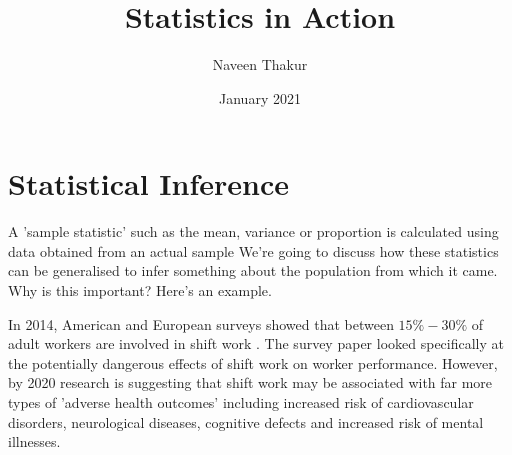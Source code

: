 \documentclass[a4paper,twosided,notoc]{tufte-book}
\author{Naveen Thakur}
\title{Statistics in Action}
\date{January 2021}
\begin{document}
\maketitle
\begin{fullwidth}
	\tableofcontents
\end{fullwidth}


\chapter{Statistical Inference}
A 'sample statistic' such as the mean, variance or proportion is calculated using data obtained from an actual sample 
We're going to discuss how these statistics can be generalised to infer something about the population from which it came. Why is this important? Here's an example.

In 2014, American and European surveys showed that between $15\%-30\%$ of adult workers are involved in shift work . The survey paper looked specifically at the potentially dangerous effects of shift work on worker performance. However, by 2020 research is suggesting that shift work may be associated with far more types of 'adverse health outcomes' including increased risk of cardiovascular disorders, neurological diseases, cognitive defects and increased risk of mental illnesses.
\end{document}
